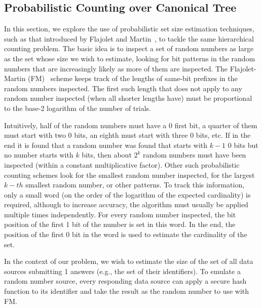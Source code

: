\documentclass[11pt,twocolumn]{MyTightStyle}
\theoremstyle{plain}
\theoremstyle{definition}
\theoremstyle{remark}
\numberwithin{equation}{section}
\begin{document}
\subsection{Probabilistic Counting over Canonical Tree}
\label{sec:probabilisticCounting}

In this section, we explore the use of probabilistic set size estimation
techniques, such as that introduced by Flajolet and
Martin~\cite{Flajolet1985}, to tackle the same hierarchical counting problem. The basic idea
is to inspect a set of random numbers as large as the set whose size we
wish to estimate, looking for bit patterns in the random numbers that
are increasingly likely as more of them are inspected.  The
Flajolet-Martin (FM)~\cite{Flajolet1985} scheme keeps track of the
lengths of same-bit prefixes in the random numbers inspected.
The first
such length that does not apply to any random number inspected (when all
shorter lengths have) must be 
proportional to the base-2 logarithm of the number of trials.

Intuitively, half of the
random numbers must have a 0 first bit, a quarter of them must start
with two 0 bits, an eighth must start with three 0 bits, etc.  If in the
end it is found that a random number was found that starts with $k-1$ 0
bits but no number starts with $k$ bits, then about $2^k$ random numbers
must have been inspected (within a constant multiplicative factor).
Other such probabilistic counting schemes look for the smallest random
number inspected, for the largest $k-th$ smallest random number, or
other patterns.  To track this information, only a small word (on the
order of the logarithm of the expected cardinality) is required,
although to increase accuracy, the algorithm must usually be applied
multiple times independently.  For
every random number inspected, the bit position of the first 1 bit of
the number is set in this word.  In the end, the position of the first 0
bit in the word is used to estimate the cardinality of the set.

In the context of our problem, we wish to estimate the size of the set
of all data sources submitting 1 answers (e.g., the set of their
identifiers).  To emulate a random number source, every responding data
source can apply a secure hash function to its identifier and take the
result as the random number to use with FM.
\end{document}
